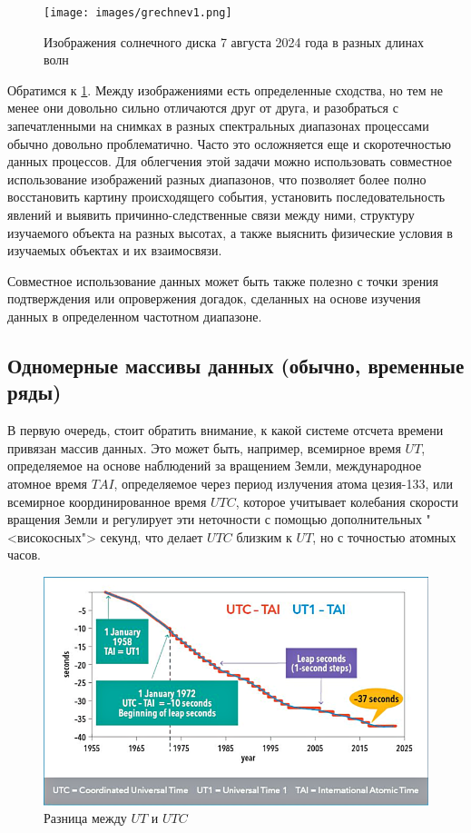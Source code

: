 \begin{figure}[h!]
	\centering
	\texttt{[image: images/grechnev1.png]}
	\caption{Изображения солнечного диска 7 августа 2024 года в разных длинах волн}
	\label{grechnev1}
\end{figure}

Обратимся к \cref{grechnev1}. Между изображениями есть определенные сходства, но тем не менее они довольно сильно отличаются друг от друга, и разобраться с запечатленными на снимках в разных спектральных диапазонах процессами обычно довольно проблематично. Часто это осложняется еще и скоротечностью данных процессов.
Для облегчения этой задачи можно использовать совместное использование изображений разных диапазонов, что позволяет более полно восстановить картину происходящего события, установить последовательность явлений и выявить причинно-следственные связи между ними, структуру изучаемого объекта на разных высотах, а также выяснить физические условия в изучаемых объектах и их взаимосвязи.

Совместное использование данных может быть также полезно с точки зрения подтверждения или опровержения догадок, сделанных на основе изучения данных в определенном частотном диапазоне.

\subsection{Одномерные массивы данных (обычно, временные ряды)}
	
В первую очередь, стоит обратить внимание, к какой системе отсчета времени привязан массив данных. Это может быть, например, всемирное время $UT$, определяемое на основе наблюдений за вращением Земли, международное атомное время $TAI$, определяемое через период излучения атома цезия-133, или всемирное координированное время $UTC$, которое учитывает колебания скорости вращения Земли и регулирует эти неточности с помощью дополнительных "<високосных"> секунд, что делает $UTC$ близким к $UT$, но с точностью атомных часов.

\begin{figure}[h!]
	\centering
	\includegraphics[width=0.55\linewidth]{images/grechnev2.png}
	\caption{Разница между $UT$ и $UTC$}
	\label{grechnev2}
\end{figure}

